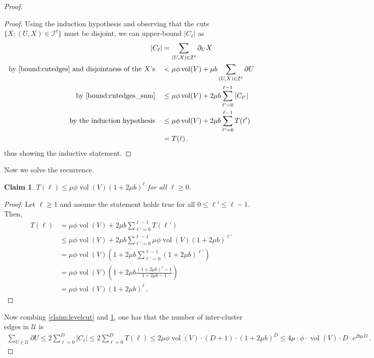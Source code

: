 \documentclass[epsfig,letter,11pt]{article}
\numberwithin{equation}{section}
\DeclareMathOperator{\vol}{vol}
\newcommand{\uncut}[2]{{\partial}_{#2} #1}
\newcommand{\uncutg}[1]{{\partial} #1}
\newtheorem{claim}[theorem]{Claim}
\begin{document}
\begin{proof}
\begin{proof}
	Using the induction hypothesis and observing that the cuts $\{X : (U,X) \in \mathcal{I}^\ell\}$ must be disjoint, we can upper-bound $|C_\ell|$ as
	\begin{align*}
		|C_\ell| & = \sum_{(U,X) \in \mathcal{I}^\ell}\uncut{X}{U} \\
		\text{by~\eqref{bound:cutedges} and disjointness of the $X$'s}\quad & < \mu \phi \vol(V) + \mu  b \sum_{(U,X) \in \mathcal{I}^\ell} \uncutg{U}\\
		\text{by~\eqref{bound:cutedges_sum}}\quad & \le \mu\phi \vol(V) + 2 \mu  b \sum_{\ell' =0}^{\ell-1} |C_{\ell'}| \\
		\text{by the induction hypothesis}\quad & \le \mu\phi \vol(V) + 2 \mu b \sum_{\ell' =0}^{\ell-1} T(\ell') \\
		& = T(\ell)\, .
	\end{align*}
	thus showing the inductive statement.
\end{proof}
\noindent
Now we solve the recurrence.
\begin{claim}
	\label{claim:recurrence}
	$T(\ell) \le \mu \phi \vol(V) (1+2\mu b)^\ell$ for all $\ell \ge 0$.
\end{claim}
\begin{proof}
	Let $\ell\ge 1$ and assume the statement holds true for all $0\le \ell'\le \ell-1$. Then,
		\begin{align*}
		T(\ell) & = \mu\phi \vol(V) + 2\mu b \sum_{\ell'=0}^{\ell-1} T(\ell') \\
		& \le \mu\phi \vol(V) + 2\mu b \sum_{\ell'=0}^{\ell-1} \mu \phi \vol(V) (1+2\mu b)^{\ell'} \\
		& = \mu\phi \vol(V) \left(1+2\mu b\sum_{\ell'=0}^{\ell-1} (1+2\mu b)^{\ell'}\right) \\
		& = \mu\phi \vol(V) \left(1+2\mu b \frac{(1+2\mu b)^{\ell}-1}{1+2\mu b-1}\right) \\
		& = \mu\phi \vol(V) (1+2\mu b)^{\ell} \, .
	\end{align*}
\end{proof}
	\noindent
	 Now combing \cref{claim:levelcut} and \cref{claim:recurrence}, one has that the number of inter-cluster edges in $\mathcal{U}$ is
	\begin{align*}
		\sum_{U \in \mathcal{U}} \uncutg{U} \le 2 \sum_{\ell=0}^{D} |C_\ell| \le 2 \sum_{\ell=0}^{D} T(\ell) \le 2 \mu\phi \vol(V)\cdot (D+1) \cdot (1+2\mu b)^{D} \le 4 \mu \cdot \phi \cdot \vol(V) \cdot D \cdot  e^{2b\mu D}\, .
	\end{align*}
\end{proof}
\end{document}
